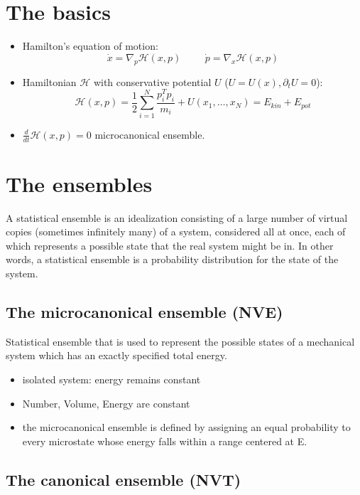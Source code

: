 \documentclass{scrartcl}
\begin{document}
\section{The basics}
\label{sec:basics}

\begin{itemize}
\item Hamilton's equation of motion:
\[ \dot{x} = \nabla_p \mathcal{H}(x,p) \hspace{1cm} \dot{p} = \nabla_x \mathcal{H}(x,p) \]
\item Hamiltonian \(\mathcal{H}\) with conservative potential \(U\)
  (\(U=U(x), \partial_t U = 0\)): 
\[\mathcal{H}(x,p) = \frac{1}{2} \sum_{i=1}^N \frac{p_i^T p_i}{m_i} + U(x_1, \dots, x_N) = E_{kin} + E_{pot} \]
\item \(\frac{d}{dt} \mathcal{H}(x,p) = 0\) microcanonical ensemble. 
\end{itemize}



\section{The ensembles}
\label{sec:ensembles}

A statistical ensemble is an idealization consisting of a large number of virtual copies (sometimes infinitely many) of a system, considered all at once, each of which represents a possible state that the real system might be in. In other words, a statistical ensemble is a probability distribution for the state of the system.

\subsection{The microcanonical ensemble (NVE)}
\label{sec:micr-ensemble-nve}

Statistical ensemble that is used to represent the possible states of
a mechanical system which has an exactly specified total energy. 
\begin{itemize}
\item isolated system: energy remains constant
\item Number, Volume, Energy are constant
\item the microcanonical ensemble is defined by assigning an equal
  probability to every microstate whose energy falls within a range
  centered at E. 
\end{itemize}

\subsection{The canonical ensemble (NVT)}
\label{sec:canon-ensemble-nvt}
\end{document}
